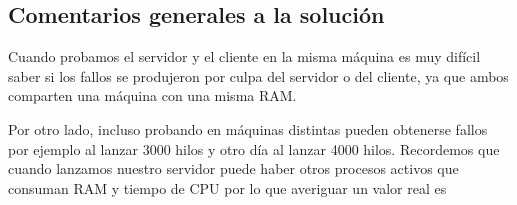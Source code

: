 \documentclass[letterpaper,10pt,spanish]{sphinxmanual}
\begin{document}
\subsection{Comentarios generales a la solución}
\label{\detokenize{textos/tema3:comentarios-generales-a-la-solucion}}
Cuando probamos el servidor y el cliente en la misma máquina es muy difícil saber si los fallos se produjeron por culpa del servidor o del cliente, ya que ambos comparten una máquina con una misma RAM.

Por otro lado, incluso probando en máquinas distintas pueden obtenerse fallos por ejemplo al lanzar 3000 hilos y otro día al lanzar 4000 hilos. Recordemos que cuando lanzamos nuestro servidor puede haber otros procesos activos que consuman RAM y tiempo de CPU por lo que averiguar un valor real es 
\end{document}
